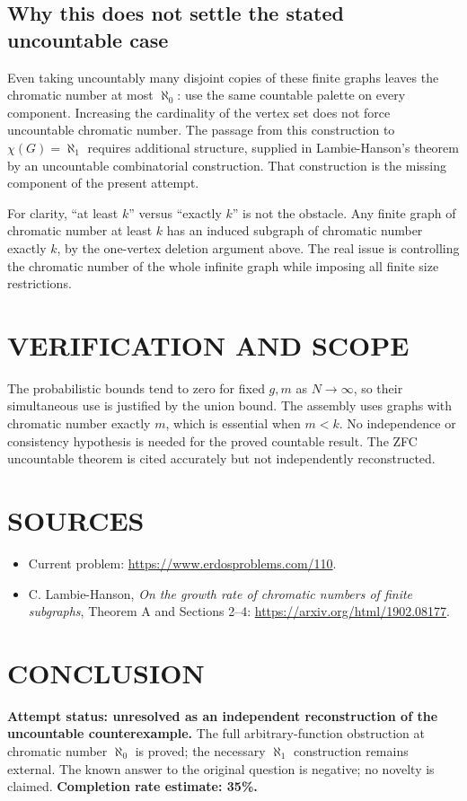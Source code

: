 \subsection{Why this does not settle the stated uncountable case}
Even taking uncountably many disjoint copies of these finite graphs leaves the chromatic number at most $\aleph_0$: use the same countable palette on every component. Increasing the cardinality of the vertex set does not force uncountable chromatic number. The passage from this construction to $\chi(G)=\aleph_1$ requires additional structure, supplied in Lambie-Hanson's theorem by an uncountable combinatorial construction. That construction is the missing component of the present attempt.

For clarity, ``at least $k$'' versus ``exactly $k$'' is not the obstacle. Any finite graph of chromatic number at least $k$ has an induced subgraph of chromatic number exactly $k$, by the one-vertex deletion argument above. The real issue is controlling the chromatic number of the whole infinite graph while imposing all finite size restrictions.

\section{VERIFICATION AND SCOPE}
The probabilistic bounds tend to zero for fixed $g,m$ as $N\to\infty$, so their simultaneous use is justified by the union bound. The assembly uses graphs with chromatic number exactly $m$, which is essential when $m<k$. No independence or consistency hypothesis is needed for the proved countable result. The ZFC uncountable theorem is cited accurately but not independently reconstructed.

\section{SOURCES}
\begin{itemize}
\item Current problem: \url{https://www.erdosproblems.com/110}.
\item C. Lambie-Hanson, \emph{On the growth rate of chromatic numbers of finite subgraphs}, Theorem A and Sections 2--4: \url{https://arxiv.org/html/1902.08177}.
\end{itemize}

\section{CONCLUSION}
\textbf{Attempt status: unresolved as an independent reconstruction of the uncountable counterexample.} The full arbitrary-function obstruction at chromatic number $\aleph_0$ is proved; the necessary $\aleph_1$ construction remains external. The known answer to the original question is negative; no novelty is claimed.
\textbf{Completion rate estimate: 35\%.}
